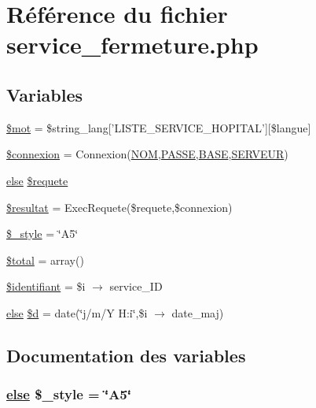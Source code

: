 \hypertarget{service__fermeture_8php}{
\section{R\'{e}f\'{e}rence du fichier service\_\-fermeture.php}
\label{service__fermeture_8php}
}
\subsection*{Variables}
\begin{CompactItemize}
\item 
\hyperlink{service__fermeture_8php_a0}{\$mot} = \$string\_\-lang\mbox{[}'LISTE\_\-SERVICE\_\-HOPITAL'\mbox{]}\mbox{[}\$langue\mbox{]}
\item 
\hyperlink{service__fermeture_8php_a1}{\$connexion} = Connexion(\hyperlink{pma__connect_8php_a0}{NOM},\hyperlink{pma__connect_8php_a1}{PASSE},\hyperlink{pma__connect_8php_a3}{BASE},\hyperlink{pma__connect_8php_a2}{SERVEUR})
\item 
\hyperlink{cron_8php_a9}{else} \hyperlink{service__fermeture_8php_a2}{\$requete}
\item 
\hyperlink{service__fermeture_8php_a3}{\$resultat} = Exec\-Requete(\$requete,\$connexion)
\item 
\hyperlink{service__fermeture_8php_a4}{\$\_\-style} = \char`\"{}A5\char`\"{}
\item 
\hyperlink{service__fermeture_8php_a5}{\$total} = array()
\item 
\hyperlink{service__fermeture_8php_a6}{\$identifiant} = \$i $\rightarrow$ service\_\-ID
\item 
\hyperlink{cron_8php_a9}{else} \hyperlink{service__fermeture_8php_a7}{\$d} = date(\char`\"{}j/m/Y H:i\char`\"{},\$i $\rightarrow$ date\_\-maj)
\end{CompactItemize}


\subsection{Documentation des variables}
\hypertarget{service__fermeture_8php_a4}{
\subsubsection[\$\_\-style]{\setlength{\rightskip}{0pt plus 5cm}\hyperlink{cron_8php_a9}{else} \$\_\-style = \char`\"{}A5\char`\"{}}}
\label{service__fermeture_8php_a4}


